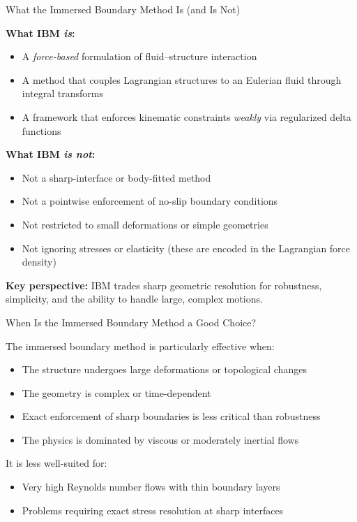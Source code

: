 \documentclass{beamer}
\begin{document}
\begin{frame}{What the Immersed Boundary Method Is (and Is Not)}
\small

\textbf{What IBM \emph{is}:}
\begin{itemize}
    \item A \emph{force-based} formulation of fluid--structure interaction
    \item A method that couples Lagrangian structures to an Eulerian fluid
          through integral transforms
    \item A framework that enforces kinematic constraints \emph{weakly}
          via regularized delta functions
\end{itemize}

\medskip

\textbf{What IBM \emph{is not}:}
\begin{itemize}
    \item Not a sharp-interface or body-fitted method
    \item Not a pointwise enforcement of no-slip boundary conditions
    \item Not restricted to small deformations or simple geometries
    \item Not ignoring stresses or elasticity (these are encoded in the
          Lagrangian force density)
\end{itemize}

\medskip

\textbf{Key perspective:}  
IBM trades sharp geometric resolution for robustness, simplicity, and
the ability to handle large, complex motions.

\end{frame}

\begin{frame}{When Is the Immersed Boundary Method a Good Choice?}
\small

The immersed boundary method is particularly effective when:
\begin{itemize}
    \item The structure undergoes large deformations or topological changes
    \item The geometry is complex or time-dependent
    \item Exact enforcement of sharp boundaries is less critical than robustness
    \item The physics is dominated by viscous or moderately inertial flows
\end{itemize}

\medskip
It is less well-suited for:
\begin{itemize}
    \item Very high Reynolds number flows with thin boundary layers
    \item Problems requiring exact stress resolution at sharp interfaces
\end{itemize}
\end{frame}
\end{document}
